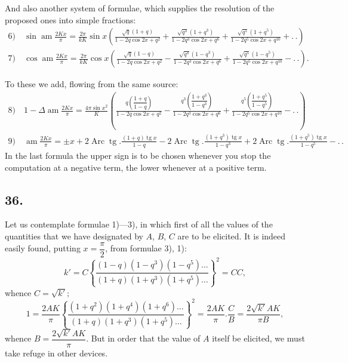 \documentclass{article}
\begin{document}
And also another system of formulae, which supplies the resolution of the proposed ones into simple fractions:
\[
\begin{gathered}
\text{6)}\quad\sin\operatorname{am}\frac{2Kx}{\pi}=\frac{2\pi}{kK}\sin x\left(\frac{\sqrt{q}(1+q)}{1-2q\cos 2x+q^{2}}+\frac{\sqrt{q^{3}}(1+q^{3})}{1-2q^{3}\cos 2x+q^{6}}+\frac{\sqrt{q^{5}}(1+q^{5})}{1-2q^{5}\cos 2x+q^{10}}+.\,.\right)
\\[2ex]
\text{7)}\quad\cos\operatorname{am}\frac{2Kx}{\pi}=\frac{2\pi}{kK}\cos x\left(\frac{\sqrt{q}(1-q)}{1-2q\cos 2x+q^{2}}-\frac{\sqrt{q^{3}}(1-q^{3})}{1-2q^{3}\cos 2x+q^{6}}+\frac{\sqrt{q^{5}}(1-q^{5})}{1-2q^{5}\cos 2x+q^{10}}-.\,.\right).
\end{gathered}
\]

To these we add, flowing from the same source:
\[
\begin{gathered}
\text{8)}\quad 1-\Delta\operatorname{am}\frac{2Kx}{\pi}=\frac{4\pi\sin x^{2}}{K}\left(\frac{q\left(\dfrac{1+q}{1-q}\right)}{1-2q\cos 2x+q^{2}}-\frac{q^{3}\left(\dfrac{1+q^{3}}{1-q^{3}}\right)}{1-2q^{3}\cos 2x+q^{6}}+\frac{q^{5}\left(\dfrac{1+q^{5}}{1-q^{5}}\right)}{1-2q^{5}\cos 2x+q^{10}}-.\,.\right)
\\[2ex]
\text{9)}\quad\operatorname{am}\frac{2Kx}{\pi}=\pm x+2\operatorname{Arc}\operatorname{tg}.\frac{(1+q)\operatorname{tg}x}{1-q}-2\operatorname{Arc}\operatorname{tg}.\frac{(1+q^{3})\operatorname{tg}x}{1-q^{3}}+2\operatorname{Arc}\operatorname{tg}.\frac{(1+q^{5})\operatorname{tg}x}{1-q^{5}}-.\,.
\end{gathered}
\]
In the last formula the upper sign is to be chosen whenever you stop the computation at a negative term, the lower whenever at a positive term.

\subsection*{36.}

Let us contemplate formulae 1)---3), in which first of all the values of the quantities that we have designated by $A$, $B$, $C$ are to be elicited. It is indeed easily found, putting $x=\dfrac{\pi}{2}$, from formulae 3), 1):
\[
k'=C\left\{\frac{(1-q)(1-q^{3})(1-q^{5})\ldots}{(1+q)(1+q^{3})(1+q^{5})\ldots}\right\}^{2}=CC,
\]
whence $C=\sqrt{k'}$;
\[
1=\frac{2AK}{\pi}\left\{\frac{(1+q^{2})(1+q^{4})(1+q^{6})\ldots}{(1+q)(1+q^{3})(1+q^{5})\ldots}\right\}^{2}=\frac{2AK}{\pi}.\frac{C}{B}=\frac{2\sqrt{k'}AK}{\pi B},
\]
whence $B=\dfrac{2\sqrt{k'}AK}{\pi}$. But in order that the value of $A$ itself be elicited, we must take refuge in other devices.
\end{document}

